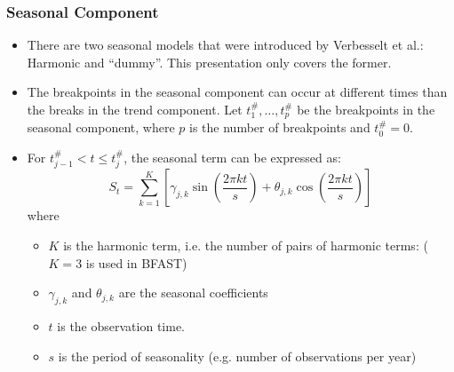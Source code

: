 \documentclass[presentation.tex]{subfiles}
\begin{document}
\begin{frame}
  \frametitle{Seasonal Component}
  \begin{itemize}
  \item 
    There are two seasonal models that were introduced by Verbesselt et al.:
    Harmonic and ``dummy''. This presentation only covers the former.
    \item 
      The breakpoints in the seasonal component can occur at different times than the
      breaks in the trend component. Let
      $t_1^{\#},\hdots, t_p^{\#}$ be the breakpoints in the seasonal component,
      where $p$ is the number of breakpoints and $t_0^{\#} = 0$.
    \item 
      
      For $t_{j-1}^{\#} < t \leq t_j^{\#}$, the seasonal term can be expressed as:
    \[
    S_t =
    \sum_{k=1}^{K}\left[\gamma_{j, k} \sin \left(\frac{2 \pi k t}{s}\right)+
      \theta_{j, k} \cos \left(\frac{2 \pi k t}{s}\right)\right]
    \]
where
\begin{itemize}
\item $K$ is the harmonic term, i.e. the number of pairs of harmonic terms:
  ($K=3$ is used in BFAST)
\item $\gamma_{j, k}$ and $\theta_{j, k}$ are the seasonal coefficients
\item $t$ is the observation time.
\item $s$ is the period of seasonality (e.g. number of observations per year)
\end{itemize}
  \end{itemize}
\end{frame}

\end{document}
